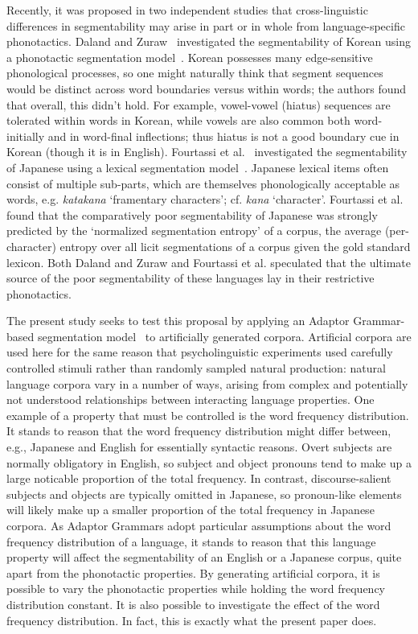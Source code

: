 \documentclass[11pt]{article}
\begin{document}
Recently, it was proposed in two independent studies that cross-linguistic differences in segmentability may arise in part or in whole from language-specific phonotactics. Daland and Zuraw~ investigated the segmentability of Korean using a phonotactic segmentation model~\cite{DP11}. Korean possesses many edge-sensitive phonological processes, so one might naturally think that segment sequences would be distinct across word boundaries versus within words; the authors found that overall, this didn't hold. For example, vowel-vowel (hiatus) sequences are tolerated within words in Korean, while vowels are also common both word-initially and in word-final inflections; thus hiatus is not a good boundary cue in Korean (though it is in English). Fourtassi et al.~ investigated the segmentability of Japanese using a lexical segmentation model~\cite{GGJ09}. Japanese lexical items often consist of multiple sub-parts, which are themselves phonologically acceptable as words, e.g. \textit{katakana} `framentary characters'; cf. \textit{kana} `character'. Fourtassi et al. found that the comparatively poor segmentability of Japanese was strongly predicted by the `normalized segmentation entropy' of a corpus, the average (per-character) entropy over all licit segmentations of a corpus given the gold standard lexicon. Both Daland and Zuraw and Fourtassi et al. speculated that the ultimate source of the poor segmentability of these languages lay in their restrictive phonotactics.

The present study seeks to test this proposal by applying an Adaptor Grammar-based segmentation model~\cite{GGJ09} to artificially generated corpora. Artificial corpora are used here for the same reason that psycholinguistic experiments used carefully controlled stimuli rather than randomly sampled natural production: natural language corpora vary in a number of ways, arising from complex and potentially not understood relationships between interacting language properties. One example of a property that must be controlled is the word frequency distribution. It stands to reason that the word frequency distribution might differ between, e.g., Japanese and English for essentially syntactic reasons. Overt subjects are normally obligatory in English, so subject and object pronouns tend to make up a large noticable proportion of the total frequency. In contrast, discourse-salient subjects and objects are typically omitted in Japanese, so pronoun-like elements will likely make up a smaller proportion of the total frequency in Japanese corpora. As Adaptor Grammars adopt particular assumptions about the word frequency distribution of a language, it stands to reason that this language property will affect the segmentability of an English or a Japanese corpus, quite apart from the phonotactic properties. By generating artificial corpora, it is possible to vary the phonotactic properties while holding the word frequency distribution constant. It is also possible to investigate the effect of the word frequency distribution. In fact, this is exactly what the present paper does.
\end{document}
